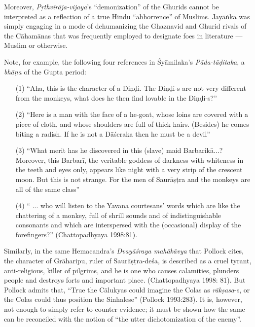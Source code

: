 Moreover, {\sl Pṛthvīrāja-vijaya}’s “demonization” of the Ghurids cannot be interpreted as a reflection of a true Hindu “abhorrence” of Muslims. Jayāṅka was simply engaging in a mode of dehumanizing the Ghaznavid and Ghurid rivals of the Cāhamānas that was frequently employed to designate foes in literature — Muslim or otherwise. 

Note, for example, the following four references in Śyāmilaka’s {\sl Pāda-tāḍitaka}, a {\sl bhāṇa} of the Gupta period: 
\begin{itemize}
\item[(1)] “Aha, this is the character of a Diṇḍi. The Diṇḍi-s are not very different from the monkeys, what does he then find lovable in the Diṇḍi-s?”

\item[(2)] “Here is a man with the face of a he-goat, whose loins are covered with a piece of cloth, and whose shoulders are full of thick hairs. (Besides) he comes biting a radish. If he is not a Dāśeraka then he must be a devil” 

\item[(3)] “What merit has he discovered in this (slave) maid Barbarikā...? Moreover, this Barbarī, the veritable goddess of darkness with whiteness in the teeth and eyes only, appears like night with a very strip of the crescent moon. But this is not strange. For the men of Saurāṣṭra and the monkeys are all of the same class” 

\item[(4)] “ ... who will listen to the Yavana courtesans’ words which are like the chattering of a monkey, full of shrill sounds and of indistinguishable consonants and which are interspersed with the (occasional) display of the forefingers?” (Chattopadhyaya 1998:81). 
\end{itemize}

Similarly, in the same Hemacandra’s {\sl Dvayāśraya mahākāvya} that Pollock cites, the character of Grāharipu, ruler of Saurāṣṭra-deśa, is described as a cruel tyrant, anti-religious, killer of pilgrims, and he is one who causes calamities, plunders people and destroys forts and important place. (Chattopadhyaya 1998: 81). But Pollock admits that, “True the Cālukyas could imagine the Colas as {\sl rākṣasa}-s, or the Colas could thus position the Sinhalese” (Pollock 1993:283). It is, however, not enough to simply refer to counter-evidence; it must be shown how the same can be reconciled with the notion of “the utter dichotomization of the enemy”. 


